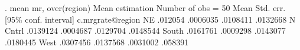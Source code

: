 . mean mr, over(region)
{\smallskip}
Mean estimation                                 Number of obs = 50
{\smallskip}
                 {\VBAR}       Mean   Std. err.     [95\% conf. interval]
c.mrgrate@region {\VBAR}
             NE  {\VBAR}    .012054   .0006035      .0108411    .0132668
        N Cntrl  {\VBAR}   .0139124   .0004687      .0129704    .0148544
          South  {\VBAR}   .0161761   .0009298      .0143077    .0180445
           West  {\VBAR}   .0307456   .0137568      .0031002     .058391
{\smallskip}
